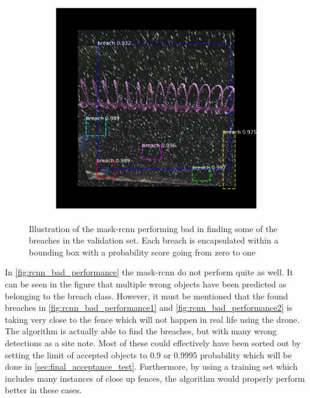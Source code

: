 \documentclass[../Head/Main.tex]{subfiles}
\begin{document}
\begin{figure}[H]
\begin{subfigure}{.23\textwidth}
        \caption{}
    \end{subfigure}
    \hfill
    \begin{subfigure}{.23\textwidth}
        \centering
        \includegraphics[width=\textwidth]{../Figures/rcnn_results/found_breaches/bad_performance/9.png}
        \caption{}
    \end{subfigure}
    \vspace{-5pt}
    \caption{Illustration of the mask-rcnn performing bad in finding some of the breaches in the validation set. Each breach is encapsulated within a bounding box with a probability score going from zero to one}
     \label{fig:rcnn_bad_performance}
\end{figure}
\vspace{-20pt}
In \autoref{fig:rcnn_bad_performance} the mask-rcnn do not perform quite as well. It can be seen in the figure that multiple wrong objects have been predicted as belonging to the breach class. However, it must be mentioned that the found breaches in \autoref{fig:rcnn_bad_performance1} and \autoref{fig:rcnn_bad_performance2} is taking very close to the fence which will not happen in real life using the drone. The algorithm is actually able to find the breaches, but with many wrong detections as a site note. Most of these could effectively have been sorted out by setting the limit of accepted objects to 0.9 or 0.9995 probability which will be done in \autoref{sec:final_acceptance_test}. Furthermore, by using a training set which includes many instances of close up fences, the algorithm would properly perform better in these cases.  
\end{document}
